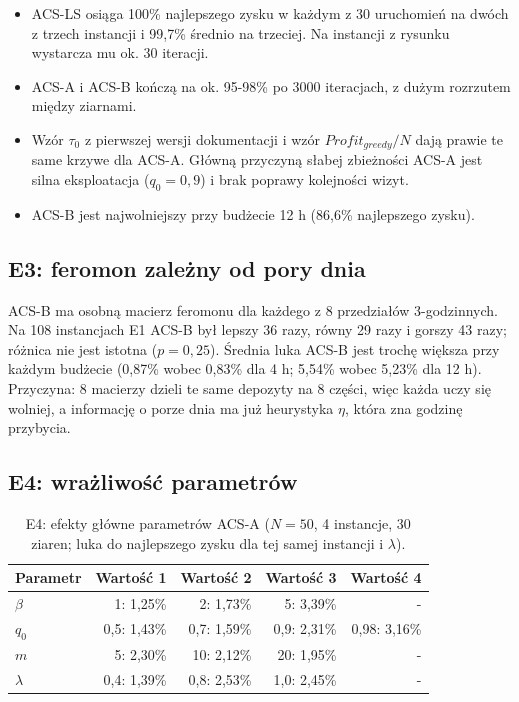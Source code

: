 \documentclass[11pt,a4paper]{article}
\begin{document}
\begin{itemize}
  \item ACS-LS osiąga 100\% najlepszego zysku w każdym z 30 uruchomień na dwóch z trzech instancji i 99,7\% średnio na trzeciej. Na instancji z rysunku wystarcza mu ok. 30 iteracji.
  \item ACS-A i ACS-B kończą na ok. 95-98\% po 3000 iteracjach, z dużym rozrzutem między ziarnami.
  \item Wzór $\tau_0$ z pierwszej wersji dokumentacji i wzór $Profit_{greedy}/N$ dają prawie te same krzywe dla ACS-A. Główną przyczyną słabej zbieżności ACS-A jest silna eksploatacja ($q_0 = 0{,}9$) i brak poprawy kolejności wizyt.
  \item ACS-B jest najwolniejszy przy budżecie 12 h (86,6\% najlepszego zysku).
\end{itemize}

\subsection{E3: feromon zależny od pory dnia}

ACS-B ma osobną macierz feromonu dla każdego z 8 przedziałów 3-godzinnych. Na 108 instancjach E1 ACS-B był lepszy 36 razy, równy 29 razy i gorszy 43 razy; różnica nie jest istotna ($p = 0{,}25$). Średnia luka ACS-B jest trochę większa przy każdym budżecie (0,87\% wobec 0,83\% dla 4 h; 5,54\% wobec 5,23\% dla 12 h). Przyczyna: 8 macierzy dzieli te same depozyty na 8 części, więc każda uczy się wolniej, a informację o porze dnia ma już heurystyka $\eta$, która zna godzinę przybycia.

\subsection{E4: wrażliwość parametrów}

\begin{table}[h]
\centering
\caption{E4: efekty główne parametrów ACS-A ($N = 50$, 4 instancje, 30 ziaren; luka do najlepszego zysku dla tej samej instancji i $\lambda$).}
\begin{tabular}{lrrrr}
\toprule
Parametr & Wartość 1 & Wartość 2 & Wartość 3 & Wartość 4 \\
\midrule
$\beta$ & 1: 1,25\% & 2: 1,73\% & 5: 3,39\% & - \\
$q_0$ & 0,5: 1,43\% & 0,7: 1,59\% & 0,9: 2,31\% & 0,98: 3,16\% \\
$m$ & 5: 2,30\% & 10: 2,12\% & 20: 1,95\% & - \\
$\lambda$ & 0,4: 1,39\% & 0,8: 2,53\% & 1,0: 2,45\% & - \\
\bottomrule
\end{tabular}
\end{table}
\end{document}
